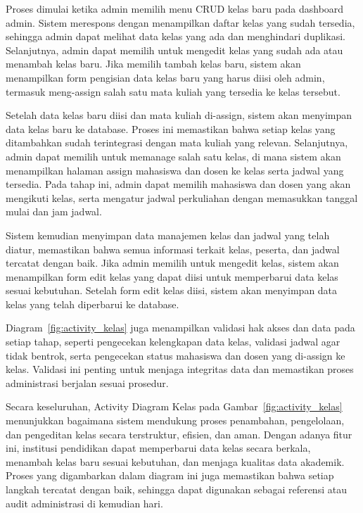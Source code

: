 \documentclass[a4paper,oneside,11pt]{book}
\begin{document}
Proses dimulai ketika admin memilih menu CRUD kelas baru pada dashboard admin. Sistem merespons dengan menampilkan daftar kelas yang sudah tersedia, sehingga admin dapat melihat data kelas yang ada dan menghindari duplikasi. Selanjutnya, admin dapat memilih untuk mengedit kelas yang sudah ada atau menambah kelas baru. Jika memilih tambah kelas baru, sistem akan menampilkan form pengisian data kelas baru yang harus diisi oleh admin, termasuk meng-assign salah satu mata kuliah yang tersedia ke kelas tersebut.

Setelah data kelas baru diisi dan mata kuliah di-assign, sistem akan menyimpan data kelas baru ke database. Proses ini memastikan bahwa setiap kelas yang ditambahkan sudah terintegrasi dengan mata kuliah yang relevan. Selanjutnya, admin dapat memilih untuk memanage salah satu kelas, di mana sistem akan menampilkan halaman assign mahasiswa dan dosen ke kelas serta jadwal yang tersedia. Pada tahap ini, admin dapat memilih mahasiswa dan dosen yang akan mengikuti kelas, serta mengatur jadwal perkuliahan dengan memasukkan tanggal mulai dan jam jadwal.

Sistem kemudian menyimpan data manajemen kelas dan jadwal yang telah diatur, memastikan bahwa semua informasi terkait kelas, peserta, dan jadwal tercatat dengan baik. Jika admin memilih untuk mengedit kelas, sistem akan menampilkan form edit kelas yang dapat diisi untuk memperbarui data kelas sesuai kebutuhan. Setelah form edit kelas diisi, sistem akan menyimpan data kelas yang telah diperbarui ke database.

Diagram~\ref{fig:activity_kelas} juga menampilkan validasi hak akses dan data pada setiap tahap, seperti pengecekan kelengkapan data kelas, validasi jadwal agar tidak bentrok, serta pengecekan status mahasiswa dan dosen yang di-assign ke kelas. Validasi ini penting untuk menjaga integritas data dan memastikan proses administrasi berjalan sesuai prosedur.

Secara keseluruhan, Activity Diagram Kelas pada Gambar~\ref{fig:activity_kelas} menunjukkan bagaimana sistem mendukung proses penambahan, pengelolaan, dan pengeditan kelas secara terstruktur, efisien, dan aman. Dengan adanya fitur ini, institusi pendidikan dapat memperbarui data kelas secara berkala, menambah kelas baru sesuai kebutuhan, dan menjaga kualitas data akademik. Proses yang digambarkan dalam diagram ini juga memastikan bahwa setiap langkah tercatat dengan baik, sehingga dapat digunakan sebagai referensi atau audit administrasi di kemudian hari.
\end{document}
